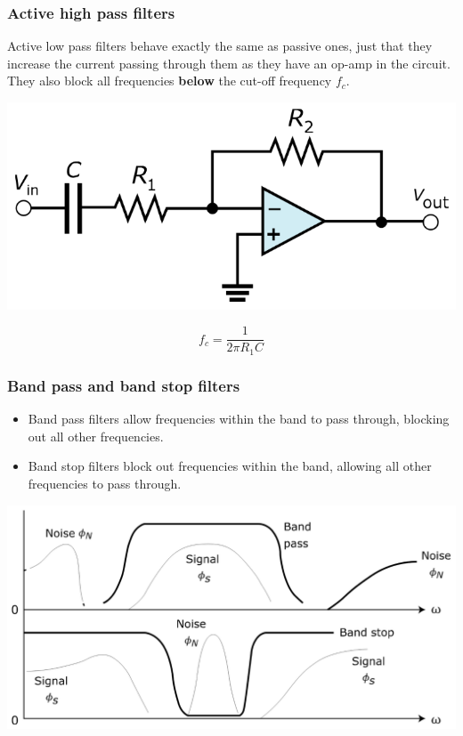 \documentclass[11pt]{article}
\begin{document}
 \newpage
\subsubsection{Active high pass filters}
\label{sec:org22f0e6e}
Active low pass filters behave exactly the same as passive ones, just that they increase the current passing through them as they have an op-amp in the circuit. They also block all frequencies \textbf{below} the cut-off frequency \(f_c\).
\begin{center}
\includegraphics[width=.9\linewidth]{./images/active-high-pass-filter.png}
\end{center}
\[f_c = \frac{1}{2 \pi R_1 C}\]

 \newpage
\subsubsection{Band pass and band stop filters}
\label{sec:org22462a8}
\begin{itemize}
\item Band pass filters allow frequencies within the band to pass through, blocking out all other frequencies.
\item Band stop filters block out frequencies within the band, allowing all other frequencies to pass through.
\end{itemize}
\begin{center}
\includegraphics[width=.9\linewidth]{./images/band-pass-and-band-stop-filters.png}
\end{center}
\end{document}

